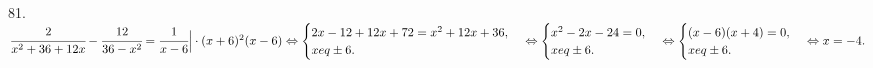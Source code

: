 81. $\cfrac{2}{x^2+36+12x}-\cfrac{12}{36-x^2}=\cfrac{1}{x-6}\Big|\cdot(x+6)^2(x-6)\Leftrightarrow
\begin{cases}2x-12+12x+72=x^2+12x+36,\\ x
eq\pm6.\end{cases}\Leftrightarrow
\begin{cases}x^2-2x-24=0,\\ x
eq\pm6.\end{cases}\Leftrightarrow
\begin{cases}(x-6)(x+4)=0,\\ x
eq\pm6.\end{cases}\Leftrightarrow x=-4.$\\
